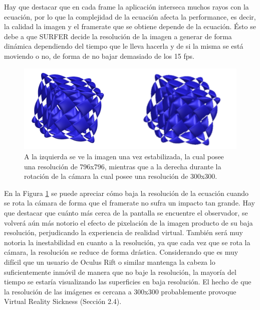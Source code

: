 \documentclass[12pt]{article}
\begin{document}
Hay que destacar que en cada frame la aplicación interseca muchos rayos con la ecuación, por lo que la complejidad de la ecuación afecta la performance, es decir, la calidad la imagen  y el framerate que se obtiene depende de la ecuación. Ésto se debe a que SURFER decide la resolución de la imagen a generar de forma dinámica dependiendo del tiempo que le lleva hacerla y de si la misma se está moviendo o no, de forma de no bajar demasiado de los 15 fps.
\begin{figure}[h]
\includegraphics[width=\textwidth]{surfer_en_movimiento.png}
\caption{A la izquierda se ve la imagen una vez estabilizada, la cual posee una resolución de 796x796, mientras que a la derecha durante la rotación de la cámara la cual posee una resolución de 300x300.}
\label{malaRES1}
\end{figure}

En la Figura \ref{malaRES1} se puede apreciar cómo baja la resolución de la ecuación cuando se rota la cámara de forma  que el framerate no sufra un impacto tan grande. Hay que destacar que cuánto más cerca de la pantalla se encuentre el observador, se volverá aún más notorio el efecto de pixelación de la imagen producto de su baja resolución, perjudicando la experiencia de realidad virtual. También será muy notoria la inestabilidad en cuanto a la resolución, ya que cada vez que se rota la cámara, la resolución se reduce de forma drástica. Considerando que es muy difícil que un  usuario de Oculus Rift o similar mantenga la cabeza lo suficientemente inmóvil de manera que no baje la resolución, la mayoría del tiempo se estaría visualizando las superficies en baja resolución. El hecho de que la resolución de las imágenes es cercana a 300x300 probablemente provoque Virtual Reality Sickness (Sección 2.4).
\end{document}
